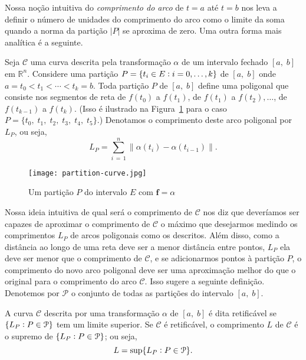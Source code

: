 Nossa noção intuitiva do \emph{comprimento do arco} de \(t = a\) até \(t = b\) nos leva a definir o número 
de unidades do comprimento do arco como o limite da soma quando a norma da partição \(|{P}|\) se aproxima de zero.  Uma outra forma mais analítica é a seguinte.

Seja \(\mathcal{C}\) uma curva descrita pela transformação \(\alpha\) de um intervalo fechado 
\([a,\; b]\) em \(\mathbb{R}^{n}\). Considere uma partição \(P =\{t_{i} \in E\vcentcolon i = 0,\ldots, 
k \}\) de \([a, \; b]\) onde \(a = t_{0} < t_{1} <\cdots < t_{k}= b\). Toda partição \(P\) de 
\([a,\; b]\) define uma poligonal  que consiste nos segmentos de reta de \(f(t_{0})\) a \(f(t_{1})\), de \(f(t_{1})\) a \(f(t_{2}),\ldots\), de \(f(t_{k-1})\) a \(f(t_{k})\). (Isso é ilustrado na Figura~\ref{fig:10-1} para o caso \(P=\{t_{0},\; t_{1},\; t_{2},\; t_{3},\; t_{4},\; t_{5}\}\).) Denotamos o  comprimento deste arco poligonal por \(L_{P}\), ou seja,
\begin{equation*}
L_{P} = \sum_{i\,=\, 1}^{n}\|\alpha(t_{i})- \alpha(t_{i-1})\|.
\end{equation*}
\begin{figure}[H]
\centering
\texttt{[image: partition-curve.jpg]}
\caption{Um partição \(P\) do intervalo \(E\) com \(\boldsymbol{f}=\alpha\)}
\label{fig:10-1}
\end{figure}

Nossa ideia intuitiva de qual será o comprimento de \(\mathcal{C}\) nos diz que deveríamos ser
capazes de aproximar o comprimento de \(\mathcal{C}\) o máximo que desejarmos medindo os 
comprimentos \(L_{P}\) de arcos poligonais como os descritos. Além disso, como a distância ao 
longo de uma reta deve ser a  menor distância entre pontos, \(L_{P}\) ela deve ser menor que o 
comprimento de \(\mathcal{C}\), e se adicionarmos  pontos à partição \(P\), o comprimento do novo 
arco poligonal deve ser uma aproximação melhor do que  o original para o comprimento do arco 
\(\mathcal{C}\). Isso sugere a seguinte definição. Denotemos por \(\mathcal{P}\) o  conjunto de todas as partições do intervalo \([a,\; b]\).

\begin{defi}
A curva \(\mathcal{C}\) descrita por uma transformação \(\alpha\) de \([a, \; b]\) é dita 
retificável se \(\{L_{P} \vcentcolon P \in \mathcal{P}\}\) tem um limite superior. Se \(\mathcal{C}\) é retificável, o comprimento \(L\) de \(\mathcal{C}\) é o 
supremo de \(\{L_{P} \vcentcolon P \in \mathcal{P}\}\); ou seja,
\begin{equation*}
 L = \sup \{L_{P} \vcentcolon P \in \mathcal{P}\}.
\end{equation*}
\end{defi}	


